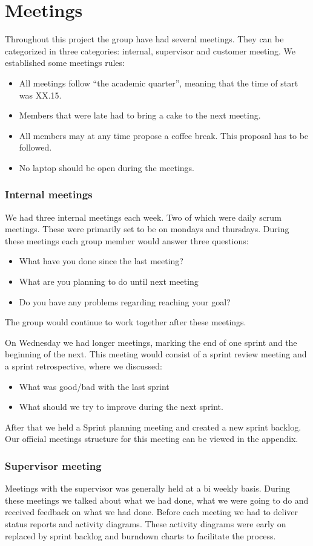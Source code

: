 \section{Meetings}
Throughout this project the group have had several meetings. They can be
categorized in three categories: internal, supervisor and customer
meeting. We established some meetings rules:
\begin{itemize}
    \item All meetings follow ``the academic quarter'', meaning that the time
        of start was XX.15.
    \item Members that were late had to bring a cake to the next meeting. 
    \item All members may at any time propose a coffee break. This proposal has
        to be followed. 
    \item No laptop should be open during the meetings. 
\end{itemize}
\subsubsection{Internal meetings}
We had three internal meetings each week. Two of which were daily scrum
meetings. These were primarily set to be on mondays and thursdays.
During these meetings each group member would answer three questions: 
\begin{itemize}
    \item What have you done since the last meeting?
    \item What are you planning to do until next meeting
    \item Do you have any problems regarding reaching your goal? 
\end{itemize}
The group would continue to work together after these meetings. 

On Wednesday we had longer meetings, marking the end of one sprint and
the beginning of the next. This meeting would consist of a sprint
review meeting and a sprint retrospective, where we discussed: 
\begin{itemize}
    \item What was good/bad with the last sprint
    \item What should we try to improve during the next sprint. 
\end{itemize}
After that we held a Sprint planning meeting and created a new sprint
backlog. Our official meetings structure for this meeting can be viewed
in the appendix. 

\subsubsection{Supervisor meeting}
Meetings with the supervisor was generally held at a bi weekly basis.
During these meetings we talked about what we had done, what we were
going to do and received feedback on what we had done. Before each
meeting we had to deliver status reports and activity diagrams. These
activity diagrams were early on replaced by sprint backlog and burndown
charts to facilitate the process. 

